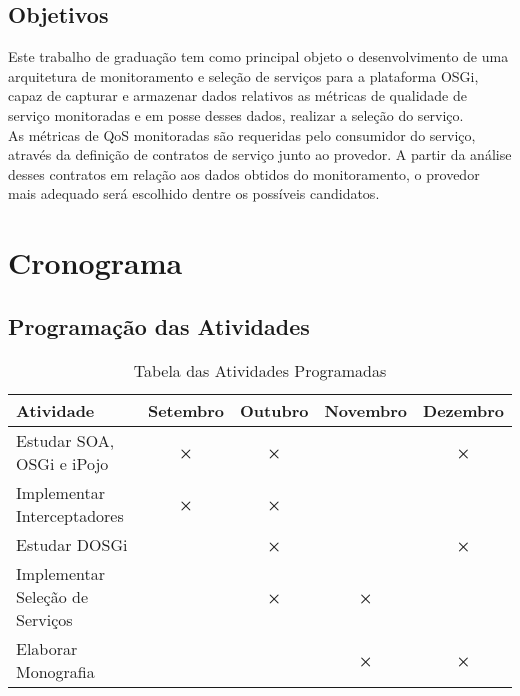 \newpage
\section{Objetivos}
\label{pr:objectives}

Este trabalho de graduação tem como principal objeto o desenvolvimento de uma arquitetura de monitoramento e seleção de serviços para a plataforma OSGi, capaz de capturar e armazenar dados relativos as métricas de qualidade de serviço monitoradas e em posse desses dados, realizar a seleção do serviço.
\\

As métricas de QoS monitoradas são requeridas pelo consumidor do serviço, através da definição de contratos de serviço junto ao provedor. A partir da análise desses contratos em relação aos dados obtidos do monitoramento, o provedor mais adequado será escolhido dentre os possíveis candidatos.

\newpage
\chapter{Cronograma}
\label{pr:chrono}

\section{Programaç\~ao das Atividades}
{%
\begin{center}
\begin{table*}[h]
\begin{supertabular}[]{|l|c|c|c|c|}\hline
\textbf{Atividade} & \textbf{Setembro} & \textbf{Outubro} & \textbf{Novembro} & \textbf{Dezembro}\\\hline
Estudar SOA, OSGi e iPojo& \textbf{×} & \textbf{×} &   & \textbf{×}\\\hline
Implementar Interceptadores & \textbf{×} & \textbf{×} &  & \\\hline
Estudar DOSGi &   & \textbf{×} &   & \textbf{×}\\\hline
Implementar Seleção de Serviços &   & \textbf{×} & \textbf{×} &  \\\hline
Elaborar Monografia &   &   & \textbf{×} & \textbf{×}\\\hline
\end{supertabular}
\caption{Tabela das Atividades Programadas}
\end{table*}
\end{center}
}%

